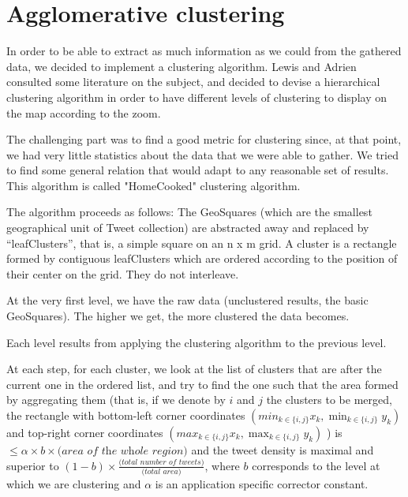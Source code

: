 \section{ Agglomerative clustering}
\label{sec:agg_clustering}
In order to be able to extract as much information as we could from the gathered data, we decided to implement a clustering algorithm. Lewis and Adrien consulted some literature on the subject, and decided to devise a hierarchical clustering algorithm in order to have different levels of clustering to display on the map according to the zoom. 

The challenging part was to find a good metric for clustering since, at that point, we had very little statistics about the data that we were able to gather. We tried to find some general relation that would adapt to any reasonable set of results. This algorithm is called "HomeCooked" clustering algorithm.

The algorithm proceeds as follows: 
The GeoSquares (which are the smallest geographical unit of Tweet collection) are abstracted away and replaced by ``leafClusters'', that is, a simple square on an n x m grid. A cluster is a rectangle formed by contiguous leafClusters which are ordered according to the position of their center on the grid. They do not interleave. 

At the very first level, we have the raw data (unclustered results, the basic GeoSquares). The higher we get, the more clustered the data becomes. 

Each level results from applying the clustering algorithm to the previous level. 

At each step, for each cluster, we look at the list of clusters that are after the current one in the ordered list, and try to find the one such that the area formed by aggregating them (that is, if we denote by $i$ and $j$ the clusters to be merged, the rectangle with bottom-left corner coordinates $(min_{k\in \{i,j\} } x_k, \min_{k\in \{i,j\}} y_k )$ and top-right corner coordinates $(max_{k\in \{i,j\}} x_k, \max_{k\in \{i,j\} } y_k)$ ) is $\leq \alpha \times b \times \textit{(area of the whole region)}$ and the tweet density is maximal and superior to $(1-b)\times \frac{\textit{(total number of tweets)}}{\textit{(total area)}}$, where $b$ corresponds to the level at which we are clustering and $\alpha$ is an application specific corrector constant. 

